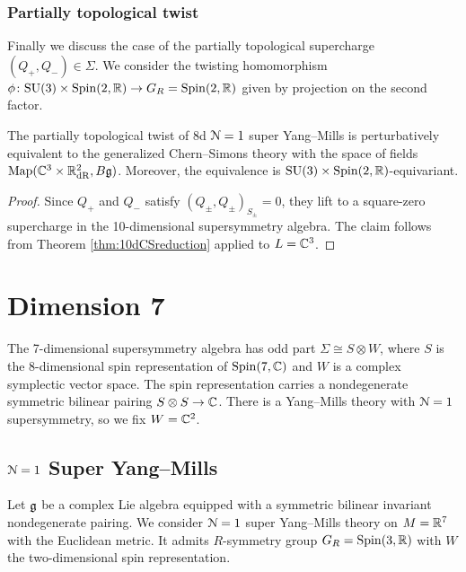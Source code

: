 \documentclass[10pt, oneside]{article}
\begin{document}
\subsubsection{Partially topological twist}

Finally we discuss the case of the partially topological supercharge $(Q_+, Q_-)\in\Sigma$. We consider the twisting homomorphism $\phi\colon \mathrm{SU}(3)\times \mathrm{Spin}(2, \mathbb R)\rightarrow G_R=\mathrm{Spin}(2, \mathbb R)$ given by projection on the second factor.

\begin{thm}
The partially topological twist of 8d $\mathcal N=1$ super Yang--Mills is perturbatively equivalent to the generalized Chern--Simons theory with the space of fields $\operatorname{Map}(\mathbb C^3\times \mathbb R^2_{\mathrm{dR}}, B\mathfrak g)$. Moreover, the equivalence is $\mathrm{SU}(3)\times \mathrm{Spin}(2, \mathbb R)$-equivariant.
\label{thm:8dpartiallytopologicaltwist}
\end{thm}
\begin{proof}
Since $Q_+$ and $Q_-$ satisfy $(Q_\pm, Q_\pm)_{S_\pm} = 0$, they lift to a square-zero supercharge in the 10-dimensional supersymmetry algebra. The claim follows from Theorem \ref{thm:10dCSreduction} applied to $L=\mathbb C^3$.
\end{proof}

\section{Dimension 7} \label{7d_section}

The 7-dimensional supersymmetry algebra has odd part $\Sigma\cong S\otimes W$, where $S$ is the 8-dimensional spin representation of $\mathrm{Spin}(7, \mathbb C)$ and $W$ is a complex symplectic vector space.  The spin representation carries a nondegenerate symmetric bilinear pairing $S\otimes S\rightarrow \mathbb C$. There is a Yang--Mills theory with $\mathcal{N}=1$ supersymmetry, so we fix $W = \mathbb C^2$.

\subsection{\texorpdfstring{$\mathcal N=1$}{N=1} Super Yang--Mills}

Let $\mathfrak g$ be a complex Lie algebra equipped with a symmetric bilinear invariant nondegenerate pairing. We consider $\mathcal N=1$ super Yang--Mills theory on $M=\mathbb R^7$ with the Euclidean metric. It admits $R$-symmetry group $G_R=\mathrm{Spin}(3, \mathbb R)$ with $W$ the two-dimensional spin representation.
\end{document}
